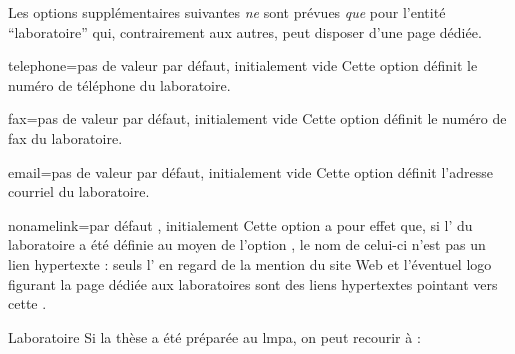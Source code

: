 Les options supplémentaires suivantes \emph{ne} sont prévues
\emph{que} pour l'entité \enquote{laboratoire} qui, contrairement
aux autres, peut disposer d'une page dédiée\pagededieelabo.
%
\begin{docKey}{telephone}{=}{pas de valeur par défaut,
    initialement vide}
  Cette option définit le numéro de téléphone du laboratoire.
\end{docKey}
%
\begin{docKey}{fax}{=}{pas de valeur par défaut,
    initialement vide}
  Cette option définit le numéro de fax du laboratoire.
\end{docKey}
%
\begin{docKey}{email}{=}{pas de valeur par
    défaut, initialement vide}
  Cette option définit l'adresse courriel du laboratoire.
\end{docKey}
%
\begin{docKey}{nonamelink}{=\textbar{}}{par défaut
    , initialement }
%
  Cette option a pour effet que, si l' du laboratoire a été
  définie au moyen de l'option , le nom de celui-ci n'est pas un
  lien hypertexte : seuls l' en regard de la mention du site Web
  et l'éventuel logo figurant la page dédiée aux laboratoires\pagededieelabo{}
  sont des liens hypertextes pointant vers cette .
\end{docKey}
%
\begin{dbexample}{Laboratoire}{}
  Si la thèse a été préparée au \gls{lmpa}, on peut recourir à :
  \NoAutoSpacing%
\begin{preamblecode}[listing options={deletekeywords={url},morekeywords={[2]url}}]
\end{preamblecode}
\end{dbexample}
